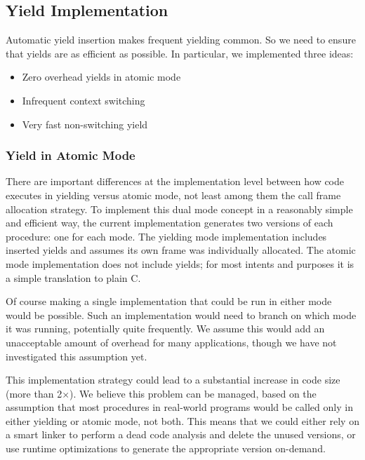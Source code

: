 \documentclass[a4paper,UKenglish,cleveref, autoref]{lipics-v2019}
\begin{document}
\subsection{Yield Implementation}
\label{sec:yield_imp}

Automatic yield insertion makes frequent yielding common.
So we need to ensure that yields are as efficient as possible.
In particular, we implemented three ideas:

\begin{itemize}
\item Zero overhead yields in atomic mode
\item Infrequent context switching
\item Very fast non-switching yield
\end{itemize}

\subsubsection{Yield in Atomic Mode}

There are important differences at the implementation level between how code executes in yielding versus atomic mode, not least among them the call frame allocation strategy.
To implement this dual mode concept in a reasonably simple and efficient way, the current \charcoal{} implementation generates two versions of each procedure: one for each mode.
The yielding mode implementation includes inserted yields and assumes its own frame was individually allocated.
The atomic mode implementation does not include yields; for most intents and purposes it is a simple translation to plain C.

Of course making a single implementation that could be run in either mode would be possible.
Such an implementation would need to branch on which mode it was running, potentially quite frequently.
We assume this would add an unacceptable amount of overhead for many applications, though we have not investigated this assumption yet.

This implementation strategy could lead to a substantial increase in code size (more than 2$\times$).
We believe this problem can be managed, based on the assumption that most procedures in real-world programs would be called only in either yielding or atomic mode, not both.
This means that we could either rely on a smart linker to perform a dead code analysis and delete the unused versions, or use runtime optimizations to generate the appropriate version on-demand.
\end{document}
